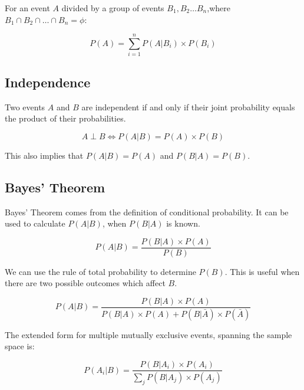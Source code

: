 \documentclass[12pt]{article}
\begin{document}
	\noindent For an event \(A\) divided by a group of events \(B_{1}, B_{2}\ldots B_{n}\),\newline where \(B_{1}\cap B_{2}\cap \ldots \cap B_{n}=\phi\):

	\begin{equation*}
		P(A)=\displaystyle \sum_{i=1}^{n}P(A|B_{i})\times P(B_{i})
	\end{equation*}
	
		\subsection{Independence}
		
		Two events \(A\) and \(B\) are independent if and only if their joint probability equals the product of their probabilities.
		
		\begin{equation*}
			A\perp B\Leftrightarrow P(A|B) = P(A)\times P(B)
		\end{equation*}
		
		\noindent This also implies that \(P(A|B)=P(A)\) and \(P(B|A)=P(B)\).
		
	\subsection{Bayes' Theorem}
	
	Bayes' Theorem comes from the definition of conditional probability. It can be used to calculate \(P(A|B)\), when \(P(B|A)\) is known.

	\begin{equation*}
		P(A|B)=\frac{P(B|A)\times P(A)}{P(B)}
	\end{equation*}
	
	\noindent We can use the rule of total probability to determine \(P(B)\). This is useful when there are two possible outcomes which affect \(B\).
	
	\begin{equation*}
		P(A|B)=\frac{P(B|A)\times P(A)}{P(B|A)\times P(A) + P(B|\bar{A})\times P(\bar{A})}
	\end{equation*}
	
	\noindent The extended form for multiple mutually exclusive events, spanning the sample space is:
	
	\begin{equation*}
		P(A_{i}|B) = \frac{P(B|A_{i})\times P(A_{i})}{\sum_{j}^{} P(B|A_{j})\times P(A_{j})}
	\end{equation*}
	
\end{document}
